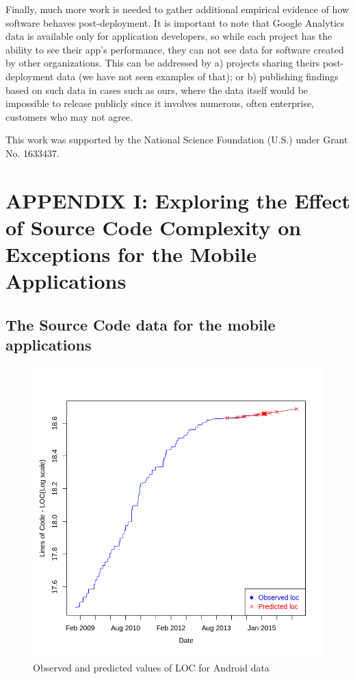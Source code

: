 \documentclass[smallcondensed]{svjour3}     %
\begin{document}
Finally, much more work is needed to gather additional empirical
evidence of how software behaves post-deployment. It is important to
note that Google Analytics data is available only for application
developers, so while each project has the ability to see their app's
performance, they can not see data for software created by other
organizations. This can be addressed by a) projects sharing theirs
post-deployment data (we have not seen examples of that); or b)
publishing findings based on such data in cases such as ours,
where the data itself would be impossible to release publicly since
it involves numerous, often enterprise, customers who may not agree.




\begin{acknowledgements}
This work was supported by the National Science Foundation (U.S.) under Grant No. 1633437.
\end{acknowledgements}



\section*{APPENDIX I: Exploring the Effect of Source Code Complexity on Exceptions for the Mobile Applications}\label{app1}

\subsection*{The Source Code data for the mobile applications}


\begin{figure}[!t]
\centering
\includegraphics[width=0.75\linewidth]{loc}
\vspace{-10pt}
\caption{Observed and predicted values of LOC for Android data}
\label{fig:LOC}
\vspace{-10pt}
\end{figure}
\end{document}
